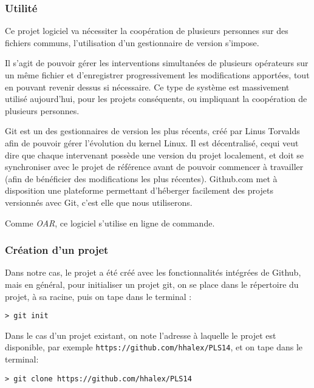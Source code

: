 \subsubsection{Utilité}
\label{sec:utilite}

\par Ce projet logiciel va nécessiter la coopération de plusieurs personnes sur des fichiers communs, l'utilisation d'un gestionnaire de version s'impose. 
\par Il s'agit de pouvoir gérer les interventions simultanées de plusieurs opérateurs sur un même fichier et d'enregistrer progressivement les modifications apportées, tout en pouvant revenir dessus si nécessaire. Ce type de système est massivement utilisé aujourd'hui, pour les projets conséquents, ou impliquant la coopération de plusieurs personnes.
\par Git est un des gestionnaires de version les plus récents, créé par Linus Torvalds afin de pouvoir gérer l'évolution du kernel Linux. Il est décentralisé, cequi veut dire que chaque intervenant possède une version du projet localement, et doit se synchroniser avec le projet de référence avant de pouvoir commencer à travailler (afin de bénéficier des modifications les plus récentes). Github.com met à disposition une plateforme permettant d'héberger facilement des projets versionnés avec Git, c'est elle que nous utiliserons.

\par Comme \emph{OAR}, ce logiciel s'utilise en ligne de commande.

\subsubsection{Création d'un projet}
\label{sec:creation-dun-projet}

\par Dans notre cas, le projet a été créé avec les fonctionnalités intégrées de Github, mais en général, pour initialiser un projet git, on se place dans le répertoire du projet, à sa racine, puis on tape dans le terminal :
\begin{verbatim}
> git init
\end{verbatim}

\par Dans le cas d'un projet existant, on note l'adresse à laquelle le projet est disponible, par exemple \texttt{https://github.com/hhalex/PLS14}, et on tape dans le terminal:
\begin{verbatim}
> git clone https://github.com/hhalex/PLS14
\end{verbatim}

